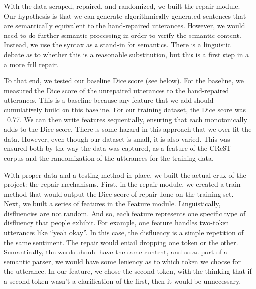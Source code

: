 \documentclass{article}
\begin{document}
\begin{flushleft}

  With the data scraped, repaired, and randomized, we built the repair module. Our hypothesis is that we can generate algorithmically generated sentences that are semantically equivalent to the hand-repaired utterances. However, we would need to do further semantic processing in order to verify the semantic content. Instead, we use the syntax as a stand-in for semantics. There is a linguistic debate as to whether this is a reasonable substitution, but this is a first step in a a more full repair.
  
\end{flushleft}

\begin{flushleft}

  To that end, we tested our baseline Dice score (see below). For the baseline, we measured the Dice score of the unrepaired utterances to the hand-repaired utterances. This is a baseline because any feature that we add should cumulatively build on this baseline. For our training dataset, the Dice score was ~0.77. We can then write features sequentially, ensuring that each monotonically adds to the Dice score. There is some hazard in this approach that we over-fit the data. However, even though our dataset is small, it is also varied. This was ensured both by the way the data was captured, as a feature of the CReST corpus and the randomization of the utterances for the training data.

\end{flushleft}

\begin{flushleft}

  With proper data and a testing method in place, we built the actual crux of the project: the repair mechanisms. First, in the repair module, we created a train method that would output the Dice score of repair done on the training set. Next, we built a series of features in the Feature module. Linguistically, disfluencies are not random. And so, each feature represents one specific type of disfluency that people exhibit. For example, one feature handles two-token utterances like ``yeah okay''. In this case, the disfluency is a simple repetition of the same sentiment. The repair would entail dropping one token or the other. Semantically, the words should have the same content, and so as part of a semantic parser, we would have some leniency as to which token we choose for the utterance. In our feature, we chose the second token, with the thinking that if a second token wasn't a clarification of the first, then it would be unnecessary.
  
\end{flushleft}
\end{document}
